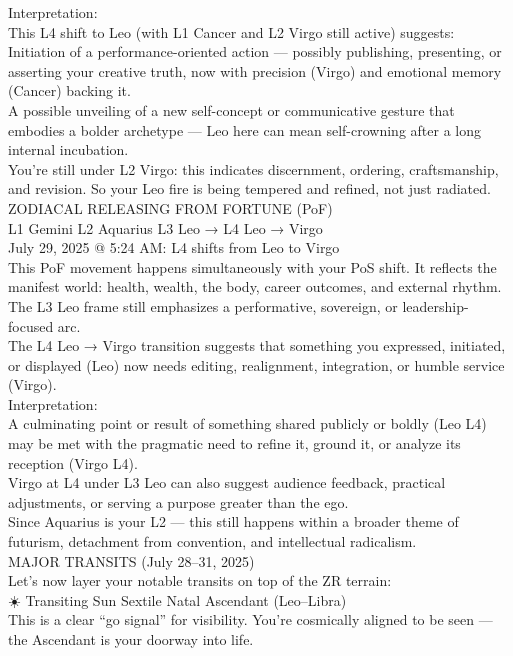 \documentclass{article}
\begin{document}
Interpretation:\\
This L4 shift to Leo (with L1 Cancer and L2 Virgo still active) suggests:\\
Initiation of a performance-oriented action --- possibly publishing, presenting, or asserting your creative truth, now with precision (Virgo) and emotional memory (Cancer) backing it.\\
A possible unveiling of a new self-concept or communicative gesture that embodies a bolder archetype --- Leo here can mean self-crowning after a long internal incubation.\\
You're still under L2 Virgo: this indicates discernment, ordering, craftsmanship, and revision. So your Leo fire is being tempered and refined, not just radiated.\\
ZODIACAL RELEASING FROM FORTUNE (PoF)\\
L1 Gemini L2 Aquarius L3 Leo → L4 Leo → Virgo\\
July 29, 2025 @ 5:24 AM: L4 shifts from Leo to Virgo\\
This PoF movement happens simultaneously with your PoS shift. It reflects the manifest world: health, wealth, the body, career outcomes, and external rhythm.\\
The L3 Leo frame still emphasizes a performative, sovereign, or leadership-focused arc.\\
The L4 Leo → Virgo transition suggests that something you expressed, initiated, or displayed (Leo) now needs editing, realignment, integration, or humble service (Virgo).\\
Interpretation:\\
A culminating point or result of something shared publicly or boldly (Leo L4) may be met with the pragmatic need to refine it, ground it, or analyze its reception (Virgo L4).\\
Virgo at L4 under L3 Leo can also suggest audience feedback, practical adjustments, or serving a purpose greater than the ego.\\
Since Aquarius is your L2 --- this still happens within a broader theme of futurism, detachment from convention, and intellectual radicalism.\\
MAJOR TRANSITS (July 28--31, 2025)\\
Let's now layer your notable transits on top of the ZR terrain:\\
☀️ Transiting Sun Sextile Natal Ascendant (Leo--Libra)\\
This is a clear ``go signal'' for visibility. You're cosmically aligned to be seen --- the Ascendant is your doorway into life.\\
\end{document}
